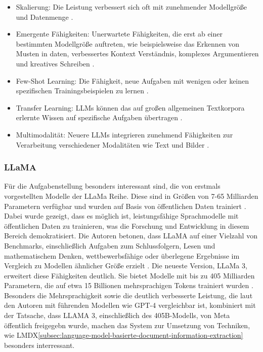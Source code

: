 \begin{itemize}[]
	\item Skalierung: Die Leistung verbessert sich oft mit zunehmender Modellgröße und Datenmenge \cite{TouvronHugo2023LOaE}.
	 
	\item Emergente Fähigkeiten: Unerwartete Fähigkeiten, die erst ab einer bestimmten Modellgröße auftreten, wie beispielsweise das Erkennen von Musten in daten, verbessertes Kontext Verständnis, komplexes Argumentieren und kreatives Schreiben \cite{BrownTomB2020LMaF}.
	 
	\item Few-Shot Learning: Die Fähigkeit, neue Aufgaben mit wenigen oder keinen spezifischen Trainingsbeispielen zu lernen \cite{BrownTomB2020LMaF}.
	
	\item Transfer Learning: LLMs können das auf großen allgemeinen Textkorpora erlernte Wissen auf spezifische Aufgaben übertragen \cite{DevlinJacob2019BPoD}.
	
	\item Multimodalität: Neuere LLMs integrieren zunehmend Fähigkeiten zur Verarbeitung verschiedener Modalitäten wie Text und Bilder \cite{LiJunnan2023BBLP}.
\end{itemize}

\subsubsection{LLaMA}
\label{subsubsec:LLaMA}
Für die Aufgabenstellung besonders interessant sind, die von \textcite{TouvronHugo2023LOaE} erstmals vorgestellten Modelle der LLaMa Reihe. Diese sind in Größen von 7-65 Milliarden Parametern verfügbar und wurden auf Basis von öffentlichen Daten trainiert \cite{TouvronHugo2023LOaE}. Dabei wurde gezeigt, dass es möglich ist, leistungsfähige Sprachmodelle mit öffentlichen Daten zu trainieren, was die Forschung und Entwicklung in diesem Bereich demokratisiert. Die Autoren betonen, dass LLaMA auf einer Vielzahl von Benchmarks, einschließlich Aufgaben zum Schlussfolgern, Lesen und mathematischem Denken, wettbewerbsfähige oder überlegene Ergebnisse im Vergleich zu Modellen ähnlicher Größe erzielt \cite{TouvronHugo2023LOaE}.
Die neueste Version, LLaMa 3, erweitert diese Fähigkeiten deutlich. Sie bietet Modelle mit bis zu 405 Milliarden Parametern, die auf etwa 15 Billionen mehrsprachigen Tokens trainiert wurden \cite{HartshornAnthony2024TL3H}. Besonders die Mehrsprachigkeit sowie die deutlich verbesserte Leistung, die laut den Autoren mit führenden Modellen wie GPT-4 vergleichbar ist, kombiniert mit der Tatsache, dass LLAMA 3, einschließlich des 405B-Modells, von Meta öffentlich freigegebn wurde, machen das System zur Umsetzung von Techniken, wie \gls{LMDX}\ref{subsec:language-model-basierte-document-information-extraction} besonders interressant.

